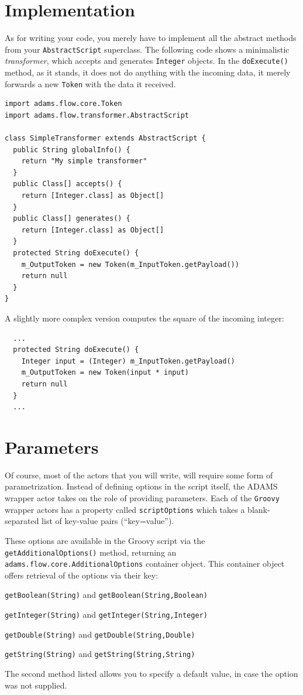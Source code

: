\documentclass[a4paper]{book}
\begin{document}
\section{Implementation}
As for writing your code, you merely have to implement all the abstract methods
from your \texttt{AbstractScript} superclass. The following code shows a
minimalistic \textit{transformer}, which accepts and generates \texttt{Integer}
objects. In the \texttt{doExecute()} method, as it stands, it does not do anything with
the incoming data, it merely forwards a new \texttt{Token} with the data
it received.
\begin{verbatim}
import adams.flow.core.Token
import adams.flow.transformer.AbstractScript

class SimpleTransformer extends AbstractScript {
  public String globalInfo() {
    return "My simple transformer"
  }
  public Class[] accepts() {
    return [Integer.class] as Object[]
  }
  public Class[] generates() {
    return [Integer.class] as Object[]
  }
  protected String doExecute() {
    m_OutputToken = new Token(m_InputToken.getPayload())
    return null
  }
}
\end{verbatim}
A slightly more complex version computes the square of the incoming integer:
\begin{verbatim}
  ...
  protected String doExecute() {
    Integer input = (Integer) m_InputToken.getPayload()
    m_OutputToken = new Token(input * input)
    return null
  }
  ...
\end{verbatim}

\newpage
\section{Parameters}
\label{parameters}
Of course, most of the actors that you will write, will require some form of
parametrization. Instead of defining options in the script itself, the ADAMS
wrapper actor takes on the role of providing parameters. Each of the
\texttt{Groovy} wrapper actors has a property called \texttt{scriptOptions}
which takes a blank-separated list of key-value pairs (``key=value'').

These options are available in the Groovy script via the
\texttt{getAdditionalOptions()} method, returning an
\texttt{adams.flow.core.AdditionalOptions} container object. This container
object offers retrieval of the options via their key:
\begin{tight_itemize}
	\item \texttt{getBoolean(String)} and \texttt{getBoolean(String,Boolean)}
	\item \texttt{getInteger(String)} and \texttt{getInteger(String,Integer)}
	\item \texttt{getDouble(String)} and \texttt{getDouble(String,Double)}
	\item \texttt{getString(String)} and \texttt{getString(String,String)}
\end{tight_itemize}
The second method listed allows you to specify a default value, in case the
option was not supplied.
\end{document}
